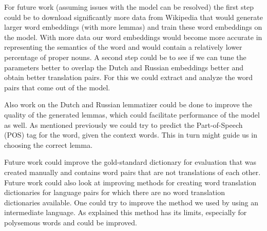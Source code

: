 \documentclass{article}
\begin{document}
For future work (assuming issues with the model can be resolved) the first step could be to download significantly more data from Wikipedia that would generate larger word embeddings (with more lemmas) and train these word embeddings on the model. With more data our word embeddings would become more accurate in representing the semantics of the word and would contain a relatively lower percentage of proper nouns. A second step could be to see if we can tune the parameters better to overlap the Dutch and Russian embeddings better and obtain better translation pairs. For this we could extract and analyze the word pairs that come out of the model. 

Also work on the Dutch and Russian lemmatizer could be done to improve the quality of the generated lemmas, which could facilitate performance of the model as well. As mentioned previously we could try to predict the Part-of-Speech (POS) tag for the word, given the context words. This in turn might guide us in choosing the correct lemma. 

Future work could improve the gold-standard dictionary for evaluation that was created manually and contains word pairs that are not translations of each other. Future work could also look at improving methods for creating word translation dictionaries for language pairs for which there are no word translation dictionaries available. One could try to improve the method we used by using an intermediate language. As explained this method has its limits, especially for polysemous words and could be improved. 



\end{document}
